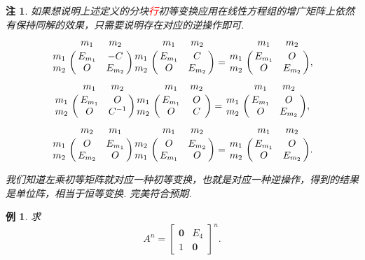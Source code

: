 \documentclass[10pt,openany]{article}
\theoremstyle{thmstyle} %
\theoremstyle{defstyle} %
\theoremstyle{prostyle} %
\theoremstyle{exastyle}
\newtheorem{example}[theorem]{例}
\theoremstyle{remstyle}
\newtheorem{remark}[theorem]{注}
\begin{document}
\begin{remark}
	如果想说明上述定义的分块\textcolor{red}{行}初等变换应用在线性方程组的增广矩阵上依然有保持同解的效果，只需要说明存在对应的逆操作即可. 
	\[ \bordermatrix{
		& m_1 & m_2 \cr
		m_1 & E_{m_1} & -C \cr
		m_2 & O & E_{m_2}
	}\bordermatrix{
		& m_1 & m_2 \cr
		m_1 & E_{m_1} & C \cr
		m_2 & O & E_{m_2}
	}=\bordermatrix{
	& m_1 & m_2 \cr
	m_1 & E_{m_1} & O \cr
	m_2 & O & E_{m_2}
	}, \]
	\[ \bordermatrix{
		& m_1 & m_2 \cr
		m_1 & E_{m_1} & O  \cr
		m_2 & O & C^{-1}
	}\bordermatrix{
		& m_1 & m_2 \cr
		m_1 & E_{m_1} & O  \cr
		m_2 & O & C
	}=\bordermatrix{
	& m_1 & m_2 \cr
	m_1 & E_{m_1} & O  \cr
	m_2 & O & E_{m_2}
	},\]
	\[ \bordermatrix{
		& m_2 & m_1 \cr
		m_1 & O & E_{m_1} \cr
		m_2 & E_{m_2} & O
	}\bordermatrix{
		& m_1 & m_2 \cr
		m_2 & O & E_{m_2} \cr
		m_1 & E_{m_1} & O
	}=\bordermatrix{
	& m_1 & m_2 \cr
	m_1 & E_{m_1} & O \cr
	m_2 & O & E_{m_2}
	}. \]
	
	我们知道左乘初等矩阵就对应一种初等变换，也就是对应一种逆操作，得到的结果是单位阵，相当于恒等变换. 完美符合预期.
\end{remark}

\begin{example}
	求
	\[ A^n=\begin{bmatrix}
		\bm{0} & E_4 \\ 1 & \bm{0}
	\end{bmatrix}^n. \]
\end{example}
\end{document}
